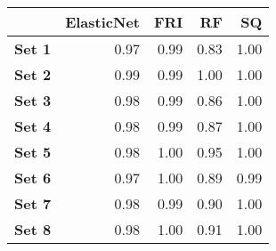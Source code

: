 \begin{tabular}{lrrrr}
\toprule
{} &  ElasticNet &   FRI &    RF &    SQ \\
\midrule
\textbf{Set 1} &        0.97 &  0.99 &  0.83 &  1.00 \\
\textbf{Set 2} &        0.99 &  0.99 &  1.00 &  1.00 \\
\textbf{Set 3} &        0.98 &  0.99 &  0.86 &  1.00 \\
\textbf{Set 4} &        0.98 &  0.99 &  0.87 &  1.00 \\
\textbf{Set 5} &        0.98 &  1.00 &  0.95 &  1.00 \\
\textbf{Set 6} &        0.97 &  1.00 &  0.89 &  0.99 \\
\textbf{Set 7} &        0.98 &  0.99 &  0.90 &  1.00 \\
\textbf{Set 8} &        0.98 &  1.00 &  0.91 &  1.00 \\
\bottomrule
\end{tabular}
